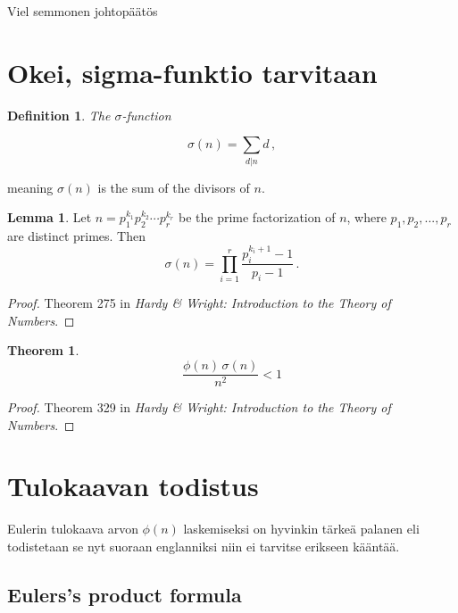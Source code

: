 \documentclass{article}
\theoremstyle{definition}
\newtheorem{definition}[subsection]{Definition}
\newtheorem{lemma}[subsubsection]{Lemma}
\newtheorem{theorem}[subsection]{Theorem}
\begin{document}
Viel semmonen johtopäätös

\section{Okei, sigma-funktio tarvitaan}

\begin{definition}{\emph{The $\sigma$-function}}

\begin{equation*}
    \sigma(n)=\sum_{d\vert n} d\,,
\end{equation*}

meaning $\sigma(n)$ is the sum of the divisors of $n$.
\end{definition}

\begin{lemma}
\label{lemma:sigma}
Let $n=p_1^{k_1}p_2^{k_2}\cdots p_r^{k_r}$ be the prime factorization of $n$, where $p_1,p_2,...,p_r$ are distinct primes. Then
\begin{equation*}
    \sigma(n)=\prod_{i=1}^r \frac{p_i^{k_i+1}-1}{p_i-1}\,.
\end{equation*}

\begin{proof}
Theorem 275 in \textit{Hardy \& Wright: Introduction to the Theory of Numbers}.
\end{proof}
\end{lemma}

\begin{theorem}
\label{thm:sigmafii}
\begin{equation*}
    \frac{\phi(n)\,\sigma(n)}{n^2}<1
\end{equation*}

\begin{proof}
Theorem 329 in \textit{Hardy \& Wright: Introduction to the Theory of Numbers}.
\end{proof}
\end{theorem}

\section{Tulokaavan todistus}

Eulerin tulokaava arvon $\phi(n)$ laskemiseksi on hyvinkin tärkeä palanen eli todistetaan se nyt suoraan englanniksi niin ei tarvitse erikseen kääntää.

\subsection{Eulers's product formula}
\end{document}
